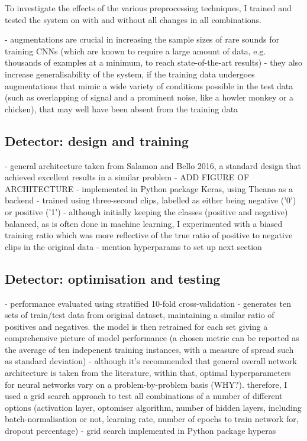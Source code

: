 \documentclass[11pt]{article}
\begin{document}
To investigate the effects of the various preprocessing techniques, I trained and tested the system on with and without all changes in all combinations.

- augmentations are crucial in increasing the sample sizes of rare sounds for training CNNs (which are known to require a large amount of data, e.g. thousands of examples at a minimum, to reach state-of-the-art results)
- they also increase generalisability of the system, if the training data undergoes augmentations that mimic a wide variety of conditions possible in the test data (such as overlapping of signal and a prominent noise, like a howler monkey or a chicken), that may well have been absent from the training data

\subsection{Detector: design and training}
- general architecture taken from Salamon and Bello 2016, a standard design that achieved excellent results in a similar problem 
- ADD FIGURE OF ARCHITECTURE
- implemented in Python package Keras, using Theano as a backend 
- trained using three-second clips, labelled as either being negative ('0') or positive ('1')
- although initially keeping the classes (positive and negative) balanced, as is often done in machine learning, I experimented with a biased training ratio which was more reflective of the true ratio of positive to negative clips in the original data
- mention hyperparams to set up next section 
\subsection{Detector: optimisation and testing}
- performance evaluated using stratified 10-fold cross-validation 
- generates ten sets of train/test data from original dataset, maintaining a similar ratio of positives and negatives. the model is then retrained for each set giving a comprehensive picture of model performance (a chosen metric can be reported as the average of ten indepenent training instances, with a measure of spread such as standard deviation) 
- although it's recommended that general overall network architecture is taken from the literature, within that, optimal hyperparameters for neural networks vary on a problem-by-problem basis (WHY?). therefore, I used a grid search approach to test all combinations of a number of different options (activation layer, optomiser algorithm, number of hidden layers, including batch-normalisation or not, learning rate, number of epochs to train network for, dropout percentage)
- grid search implemented in Python package hyperas
\end{document}

